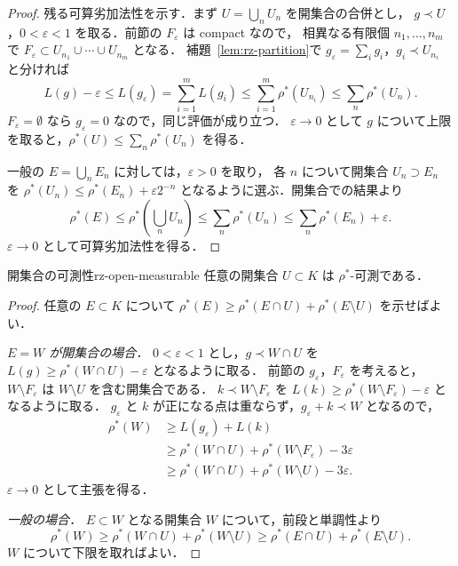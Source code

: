 \begin{proof}
  残る可算劣加法性を示す．まず $U=\bigcup_nU_n$ を開集合の合併とし，
  $g\prec U$，$0<\varepsilon<1$ を取る．前節の $F_\varepsilon$ は compact なので，
  相異なる有限個 $n_1,\dots,n_m$ で $F_\varepsilon\subset U_{n_1}\cup\cdots\cup U_{n_m}$ となる．
  補題~\ref{lem:rz-partition}で $g_\varepsilon=\sum_ig_i$，$g_i\prec U_{n_i}$ と分ければ
  \[
    L(g)-\varepsilon\leq L(g_\varepsilon)=\sum_{i=1}^mL(g_i)
    \leq\sum_{i=1}^m\rho^*(U_{n_i})\leq\sum_n\rho^*(U_n).
  \]
  $F_\varepsilon=\emptyset$ なら $g_\varepsilon=0$ なので，同じ評価が成り立つ．
  $\varepsilon\to0$ として $g$ について上限を取ると，$\rho^*(U)\leq\sum_n\rho^*(U_n)$ を得る．

  一般の $E=\bigcup_nE_n$ に対しては，$\varepsilon>0$ を取り，
  各 $n$ について開集合 $U_n\supset E_n$ を
  $\rho^*(U_n)\leq\rho^*(E_n)+\varepsilon2^{-n}$ となるように選ぶ．開集合での結果より
  \[
    \rho^*(E)\leq\rho^*\left(\bigcup_nU_n\right)\leq\sum_n\rho^*(U_n)
    \leq\sum_n\rho^*(E_n)+\varepsilon.
  \]
  $\varepsilon\to0$ として可算劣加法性を得る．
\end{proof}

\begin{lemma}{開集合の可測性}{rz-open-measurable}
  任意の開集合 $U\subset K$ は $\rho^*$-可測である．
\end{lemma}

\begin{proof}
  任意の $E\subset K$ について $\rho^*(E)\geq\rho^*(E\cap U)+\rho^*(E\setminus U)$ を示せばよい．

  \emph{$E=W$ が開集合の場合．}
  $0<\varepsilon<1$ とし，$g\prec W\cap U$ を
  $L(g)\geq\rho^*(W\cap U)-\varepsilon$ となるように取る．
  前節の $g_\varepsilon$，$F_\varepsilon$ を考えると，
  $W\setminus F_\varepsilon$ は $W\setminus U$ を含む開集合である．
  $k\prec W\setminus F_\varepsilon$ を $L(k)\geq\rho^*(W\setminus F_\varepsilon)-\varepsilon$ となるように取る．
  $g_\varepsilon$ と $k$ が正になる点は重ならず，$g_\varepsilon+k\prec W$ となるので，
  \[
    \begin{aligned}
      \rho^*(W)&\geq L(g_\varepsilon)+L(k)\\
      &\geq\rho^*(W\cap U)+\rho^*(W\setminus F_\varepsilon)-3\varepsilon\\
      &\geq\rho^*(W\cap U)+\rho^*(W\setminus U)-3\varepsilon.
    \end{aligned}
  \]
  $\varepsilon\to0$ として主張を得る．

  \emph{一般の場合．}
  $E\subset W$ となる開集合 $W$ について，前段と単調性より
  \[
    \rho^*(W)\geq\rho^*(W\cap U)+\rho^*(W\setminus U)
    \geq\rho^*(E\cap U)+\rho^*(E\setminus U).
  \]
  $W$ について下限を取ればよい．
\end{proof}

